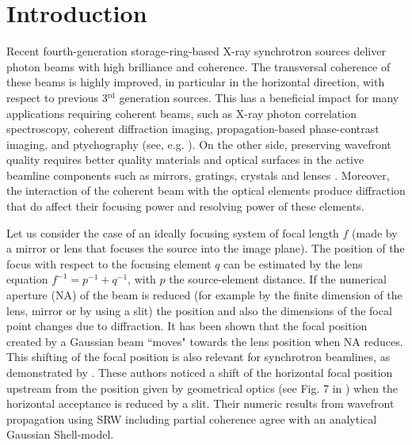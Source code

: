 \documentclass{iucr}              %
\begin{document}
\section{Introduction}
\label{sec:introduction}


Recent fourth-generation storage-ring-based X-ray synchrotron sources deliver photon beams with high brilliance and coherence. The transversal coherence of these beams is highly improved, in particular in the horizontal direction, with respect to previous 3$^{\text{rd}}$ generation sources. This has a beneficial impact for many applications requiring coherent beams, such as X-ray photon correlation spectroscopy, coherent diffraction imaging, propagation-based phase-contrast imaging, and ptychography (see, e.g. \cite{paganin_book}). On the other side, preserving wavefront quality requires better quality materials and optical surfaces in the active beamline components such as mirrors, gratings, crystals and lenses \cite{Yabashi, Roth2017}. Moreover, the interaction of the coherent beam with the optical elements produce diffraction that do affect their focusing power and resolving power of these elements.

Let us consider the case of an ideally focusing system of focal length $f$ (made by a mirror or lens that focuses the source into the image plane). The position of the focus with respect to the focusing element $q$ can be estimated by the lens equation $f^{-1}=p^{-1}+q^{-1}$, with $p$ the source-element distance. If the numerical aperture (NA) of the beam is reduced (for example by the finite dimension of the lens, mirror or by using a slit) the position and also the dimensions of the focal point changes due to diffraction. It has been shown \cite{Tanaka:85} that the focal position created by a Gaussian beam ``moves" towards the lens position when NA reduces. This shifting of the focal position is also relevant for synchrotron beamlines, as demonstrated by . These authors noticed a shift of the horizontal focal position upstream from the position given by geometrical optics (see Fig. 7 in ) when the horizontal acceptance is reduced by a slit. Their numeric results from wavefront propagation using SRW \cite{codeSRW} including partial coherence agree with an analytical Gaussian Shell-model.
\end{document}
